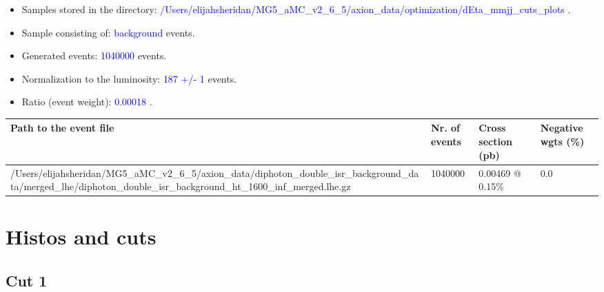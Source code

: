 \documentclass[a4paper, 10pt]{article}
\begin{document}
\begin{itemize}
  \item Samples stored in the directory: \textcolor{blue}{/\-Users/\-elijahsheridan/\-MG5\_aMC\_v2\_6\_5/\-axion\_data/\-optimization/\-dEta\_mmjj\_cuts\_plots} .
   \item Sample consisting of: \textcolor{blue}{background}  events.
   \item Generated events: \textcolor{blue}{1040000 }  events.
   \item Normalization to the luminosity: \textcolor{blue}{187}\textcolor{blue}{ +/\-- }\textcolor{blue}{1 }  events.
   \item Ratio (event weight): \textcolor{blue}{0.00018 } .  
 
\end{itemize}
\begin{table}[H]
  \begin{center}
    \begin{tabular}{|m{55.0mm}|m{25.0mm}|m{30.0mm}|m{30.0mm}|}
      \hline
      {\cellcolor{yellow}         Path to the event file}& {\cellcolor{yellow}         Nr. of events}& {\cellcolor{yellow}         Cross section (pb)}& {\cellcolor{yellow}         Negative wgts (\%)}\\
      \hline
      {\cellcolor{white}          /\-Users/\-elijahsheridan/\-MG5\_aMC\_v2\_6\_5/\-axion\_data/\-diphoton\_double\_isr\_background\_data/\-merged\_lhe/\-diphoton\_double\_isr\_background\_ht\_1600\_inf\_merged.lhe.gz}& {\cellcolor{white}          1040000}& {\cellcolor{white}          0.00469 @ 0.15\%}& {\cellcolor{white}          0.0}\\
\hline
    \end{tabular}
  \end{center}
\end{table}

\newpage
\section{ Histos and cuts}

\subsection{Cut 1}
\end{document}
